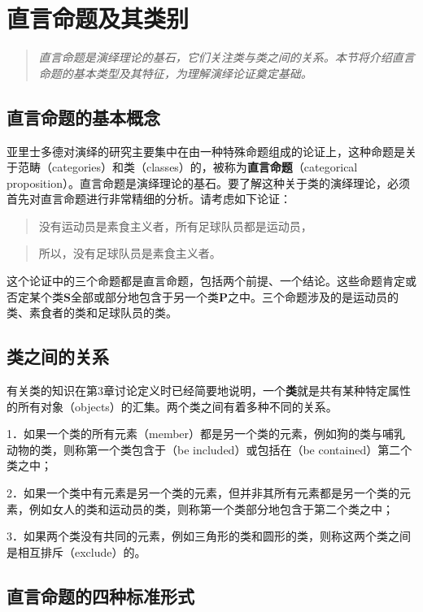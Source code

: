 \section{直言命题及其类别}

\begin{quotation}
\textit{直言命题是演绎理论的基石，它们关注类与类之间的关系。本节将介绍直言命题的基本类型及其特征，为理解演绎论证奠定基础。}
\end{quotation}

\subsection{直言命题的基本概念}

亚里士多德对演绎的研究主要集中在由一种特殊命题组成的论证上，这种命题是关于范畴（categories）和类（classes）的，被称为\textbf{直言命题}（categorical proposition）。直言命题是演绎理论的基石。要了解这种关于类的演绎理论，必须首先对直言命题进行非常精细的分析。请考虑如下论证：

\begin{quote}
没有运动员是素食主义者，所有足球队员都是运动员，
\end{quote}

\begin{quote}
所以，没有足球队员是素食主义者。
\end{quote}

这个论证中的三个命题都是直言命题，包括两个前提、一个结论。这些命题肯定或否定某个类$\boldsymbol{S}$全部或部分地包含于另一个类$\boldsymbol{P}$之中。三个命题涉及的是运动员的类、素食者的类和足球队员的类。

\subsection{类之间的关系}

有关类的知识在第3章讨论定义时已经简要地说明，一个\textbf{类}就是共有某种特定属性的所有对象（objects）的汇集。两个类之间有着多种不同的关系。

1．如果一个类的所有元素（member）都是另一个类的元素，例如狗的类与哺乳动物的类，则称第一个类包含于（be included）或包括在（be contained）第二个类之中；

2．如果一个类中有元素是另一个类的元素，但并非其所有元素都是另一个类的元素，例如女人的类和运动员的类，则称第一个类部分地包含于第二个类之中；

3．如果两个类没有共同的元素，例如三角形的类和圆形的类，则称这两个类之间是相互排斥（exclude）的。

\subsection{直言命题的四种标准形式}

